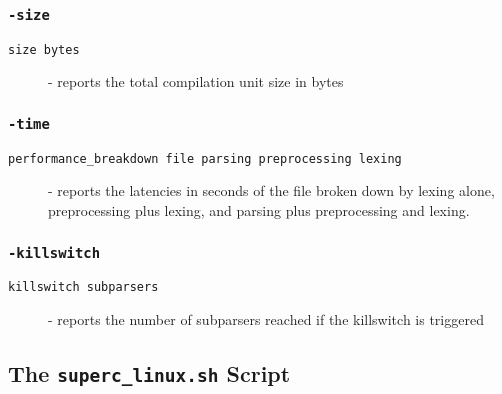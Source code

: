 \documentclass{article}
\begin{document}
\subsubsection{\texttt{-size}}
\begin{description}
\item[\texttt{size bytes}] - reports the total compilation unit size in bytes
\end{description}

\subsubsection{\texttt{-time}}
\begin{description}
\item[\texttt{performance\_breakdown file parsing preprocessing
    lexing}] - reports the latencies in seconds of the file broken
  down by lexing alone, preprocessing plus lexing, and parsing plus
  preprocessing and lexing.
\end{description}

\subsubsection{\texttt{-killswitch}}
\begin{description}
\item[\texttt{killswitch subparsers}] - reports the number of
  subparsers reached if the killswitch is triggered
\end{description}


\subsection{The \texttt{superc\_linux.sh} Script}
\end{document}
